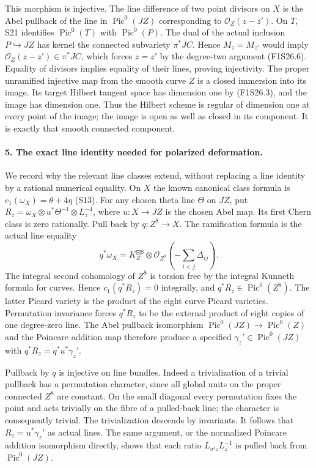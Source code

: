This morphism is injective. The line difference of two
point divisors on $X$ is the Abel pullback of the line in
$\operatorname{Pic}^0(JZ)$ corresponding to $\mathcal O_Z(z-z')$.
On $T$, S21 identifies $\operatorname{Pic}^0(T)$ with
$\operatorname{Pic}^0(P)$. The dual of the actual inclusion
$P\hookrightarrow JZ$ has kernel the connected subvariety
$\pi^*JC$. Hence $M_z=M_{z'}$ would imply
$\mathcal O_Z(z-z')\in\pi^*JC$, which forces $z=z'$ by
the degree-two argument (F1S26.6). Equality of divisors
implies equality of their lines, proving injectivity.
The proper unramified injective map from the smooth curve
$Z$ is a closed immersion into its image. Its target
Hilbert tangent space has dimension one by (F1S26.3), and
the image has dimension one. Thus the Hilbert scheme is
regular of dimension one at every point of the image;
the image is open as well as closed in its component.
It is exactly that smooth connected component.

\paragraph{5. The exact line identity needed for polarized deformation.}
We record why the relevant line classes extend, without
replacing a line identity by a rational numerical equality.
On $X$ the known canonical class formula is
$c_1(\omega_X)=\theta+4\eta$ (S13). For any chosen theta
line $\Theta$ on $JZ$, put
$R_z=\omega_X\otimes u^*\Theta^{-1}\otimes L_z^{-4}$,
where $u:X\to JZ$ is the chosen Abel map.
Its first Chern class is zero rationally. Pull back by
$q:Z^8\to X$. The ramification formula is the actual
line equality
\[
 q^*\omega_X=K_Z^{\boxtimes8}
                      \otimes\mathcal O_{Z^8}(-\sum_{i<j}\Delta_{ij}).
 \tag{F1S26.17}
\]
The integral second cohomology of $Z^8$ is torsion free
by the integral Kunneth formula for curves. Hence
$c_1(q^*R_z)=0$ integrally, and $q^*R_z\in\operatorname{Pic}^0(Z^8)$.
The latter Picard variety is the product of the eight
curve Picard varieties. Permutation invariance forces
$q^*R_z$ to be the external product of eight copies of
one degree-zero line. The Abel pullback isomorphism
$\operatorname{Pic}^0(JZ)\to\operatorname{Pic}^0(Z)$ and
the Poincare addition map therefore produce a specified
$\gamma_z'\in\operatorname{Pic}^0(JZ)$ with
$q^*R_z=q^*u^*\gamma_z'$.

Pullback by $q$ is injective on line bundles. Indeed a
trivialization of a trivial pullback has a permutation
character, since all global units on the proper connected
$Z^8$ are constant. On the small diagonal every permutation
fixes the point and acts trivially on the fibre of a
pulled-back line; the character is consequently trivial.
The trivialization descends by invariants. It follows that
$R_z=u^*\gamma_z'$ as actual lines.
The same argument, or the normalized Poincare addition
isomorphism directly, shows that each ratio
$L_{\sigma^iz}L_z^{-1}$ is pulled back from
$\operatorname{Pic}^0(JZ)$.

